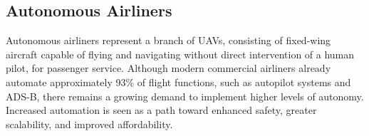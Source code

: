 \subsection{Autonomous Airliners}

Autonomous airliners represent a branch of \glspl{UAV}, consisting of fixed-wing aircraft capable of flying and navigating without direct intervention of a human pilot, for passenger service.
Although modern commercial airliners already automate approximately 93\% of flight functions, such as autopilot systems and \gls{ADS-B}, there remains a growing demand to implement higher levels of autonomy.
Increased automation is seen as a path toward enhanced safety, greater scalability, and improved affordability.



